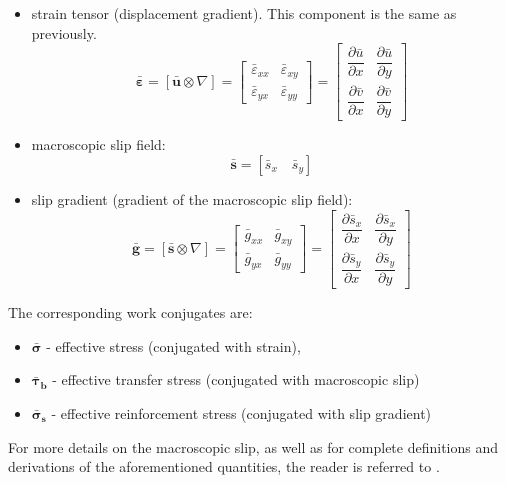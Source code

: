 \documentclass[11pt]{article}
\begin{document}
\begin{itemize}
    \item strain tensor (displacement gradient). This component is the same as previously.
    \begin{equation}
        \bm{\bar{\varepsilon}} = \left[ \bm{\bar{u}} \otimes \nabla \right] = 
        \begin{bmatrix}
            \bar{\varepsilon}_{xx} & \bar{\varepsilon}_{xy}\\
            \bar{\varepsilon}_{yx} & \bar{\varepsilon}_{yy} 
        \end{bmatrix}  =
        \begin{bmatrix}
            \dfrac{\partial \bar{u}}{\partial x} & \dfrac{\partial \bar{u}}{\partial y} \\
            \dfrac{\partial \bar{v}}{\partial x}  & \dfrac{\partial \bar{v}}{\partial y}  
           \end{bmatrix} 
    \end{equation}    
    \item macroscopic slip field:
    \begin{equation}
        \bm{\bar{s}} = \left[ \bar{s}_x \quad \bar{s}_y \right]
    \end{equation}
    \item slip gradient (gradient of the macroscopic slip field):
    \begin{equation}
        \bm{\bar{g}} = \left[ \bm{\bar{s}} \otimes \nabla \right] = 
        \begin{bmatrix}
            \bar{g}_{xx} & \bar{g}_{xy}\\
            \bar{g}_{yx} & \bar{g}_{yy} 
        \end{bmatrix}  =
        \begin{bmatrix}
            \dfrac{\partial \bar{s}_x}{\partial x} & \dfrac{\partial \bar{s}_x}{\partial y} \\
            \dfrac{\partial \bar{s}_y}{\partial x}  & \dfrac{\partial \bar{s}_y}{\partial y}  
           \end{bmatrix} 
    \end{equation}
\end{itemize}

\noindent The corresponding work conjugates are:
\begin{itemize}
    \item $\bm{\bar{\sigma}}$ - effective stress (conjugated with strain),
    \item $\bm{\bar{\tau}_b}$ - effective transfer stress (conjugated with macroscopic slip)
    \item $\bm{\bar{\sigma}_s}$ - effective reinforcement stress (conjugated with slip gradient)
\end{itemize}
For more details on the macroscopic slip, as well as for complete definitions and derivations of the aforementioned quantities, the reader is referred to \cite{PaperB}.
\end{document}
